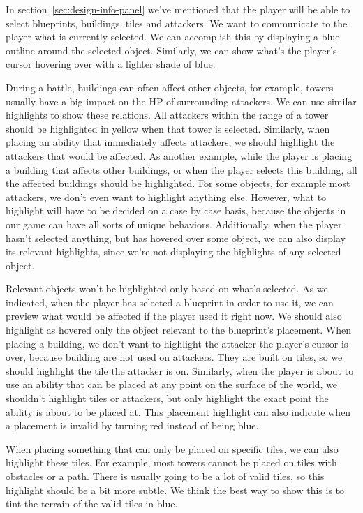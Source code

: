 In section~\ref{sec:design-info-panel} we've mentioned that the player will be able to select blueprints, buildings, tiles and attackers.
We want to communicate to the player what is currently selected.
We can accomplish this by displaying a blue outline around the selected object.
Similarly, we can show what's the player's cursor hovering over with a lighter shade of blue.

During a battle, buildings can often affect other objects, for example, towers usually have a big impact on the HP of surrounding attackers.
We can use similar highlights to show these relations.
All attackers within the range of a tower should be highlighted in yellow when that tower is selected.
Similarly, when placing an ability that immediately affects attackers, we should highlight the attackers that would be affected.
As another example, while the player is placing a building that affects other buildings, or when the player selects this building, all the affected buildings should be highlighted.
For some objects, for example most attackers, we don't even want to highlight anything else.
However, what to highlight will have to be decided on a case by case basis, because the objects in our game can have all sorts of unique behaviors.
Additionally, when the player hasn't selected anything, but has hovered over some object, we can also display its relevant highlights, since we're not displaying the highlights of any selected object.

Relevant objects won't be highlighted only based on what's selected.
As we indicated, when the player has selected a blueprint in order to use it, we can preview what would be affected if the player used it right now.
We should also highlight as hovered only the object relevant to the blueprint's placement.
When placing a building, we don't want to highlight the attacker the player's cursor is over, because building are not used on attackers.
They are built on tiles, so we should highlight the tile the attacker is on.
Similarly, when the player is about to use an ability that can be placed at any point on the surface of the world, we shouldn't highlight tiles or attackers, but only highlight the exact point the ability is about to be placed at.
This placement highlight can also indicate when a placement is invalid by turning red instead of being blue.

When placing something that can only be placed on specific tiles, we can also highlight these tiles.
For example, most towers cannot be placed on tiles with obstacles or a path.
There is usually going to be a lot of valid tiles, so this highlight should be a bit more subtle.
We think the best way to show this is to tint the terrain of the valid tiles in blue.

